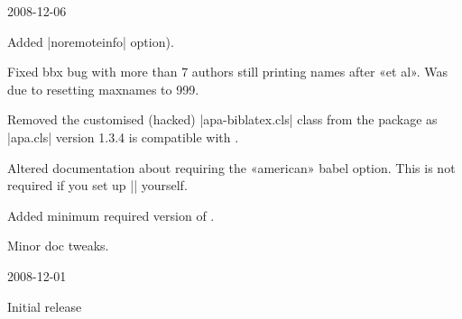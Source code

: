 \documentclass{ltxdockit}
\begin{document}
\begin{changelog}
\begin{release}{0.2}{2008-12-06}
\item Added |noremoteinfo| option).
\item Fixed bbx bug with more than 7 authors still printing names after «et al». Was
  due to resetting maxnames to 999.
\item Removed the customised (hacked) |apa-biblatex.cls| class from the package as
  |apa.cls| version 1.3.4 is compatible with .
\item Altered documentation about requiring the «american» babel option.
  This is not required if you set up |\DeclareQuotePunctuation| yourself.
\item Added minimum required version of .
\item Minor doc tweaks.
\end{release}

\begin{release}{0.1}{2008-12-01}
\item Initial release
\end{release}



\end{changelog}
\end{document}
